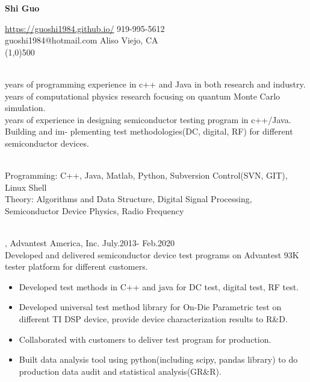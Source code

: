 \documentclass[11pt]{article} %
\begin{document}
 \centerline{\Large \bf Shi Guo}
  \noindent \url{https://guoshi1984.github.io/} \hspace{80mm}  919-995-5612\\
    guoshi1984@hotmail.com \hspace{95mm}   Aliso Viejo, CA\\
\line(1,0){500}


\vspace{2mm}

\\
 years of programming experience in c++ and Java in both research and industry.  \\
 years of computational physics research focusing on quantum Monte Carlo simulation. \\
 years of experience in designing semiconductor testing program in c++/Java. Building and im-
plementing test methodologies(DC, digital, RF) for different semiconductor devices.\\

\vspace{-2mm}

\\
\noindent 
Programming: C++, Java, Matlab, Python, Subversion Control(SVN, GIT), Linux Shell\\
Theory: Algorithms and Data Structure, Digital Signal Processing, Semiconductor Device Physics, Radio Frequency\\

\vspace{0mm}

\\
, Advantest America, Inc. July.2013- Feb.2020\\
\noindent Developed and delivered semiconductor device test programs on Advantest 93K tester platform for different customers.\\ 
\begin{itemize}  
    \item Developed test methods in C++ and java for DC test, digital test, RF test.\\
 \vspace{-4mm}
    \item  Developed universal test method library for On-Die Parametric test on different TI DSP device, provide device characterization results to R\&D.\\ 
 \vspace{-4mm}
  \item Collaborated with customers to deliver test program for production.\\
 \vspace{-4mm}
  \item Built data analysis tool using python(including scipy, pandas library) to do production data audit and statistical analysis(GR\&R).\\ 
 \end{itemize}
\end{document}
